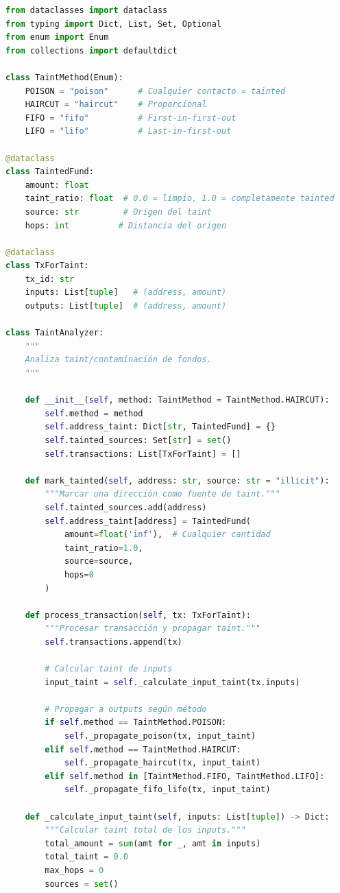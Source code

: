 \documentclass[11pt,a4paper,twoside]{book}
\theoremstyle{definition}
\theoremstyle{remark}
\begin{document}
\begin{lstlisting}[language=Python, caption={Sistema de Taint Analysis}]
from dataclasses import dataclass
from typing import Dict, List, Set, Optional
from enum import Enum
from collections import defaultdict

class TaintMethod(Enum):
    POISON = "poison"      # Cualquier contacto = tainted
    HAIRCUT = "haircut"    # Proporcional
    FIFO = "fifo"          # First-in-first-out
    LIFO = "lifo"          # Last-in-first-out

@dataclass
class TaintedFund:
    amount: float
    taint_ratio: float  # 0.0 = limpio, 1.0 = completamente tainted
    source: str         # Origen del taint
    hops: int          # Distancia del origen

@dataclass
class TxForTaint:
    tx_id: str
    inputs: List[tuple]   # (address, amount)
    outputs: List[tuple]  # (address, amount)

class TaintAnalyzer:
    """
    Analiza taint/contaminación de fondos.
    """
    
    def __init__(self, method: TaintMethod = TaintMethod.HAIRCUT):
        self.method = method
        self.address_taint: Dict[str, TaintedFund] = {}
        self.tainted_sources: Set[str] = set()
        self.transactions: List[TxForTaint] = []
    
    def mark_tainted(self, address: str, source: str = "illicit"):
        """Marcar una dirección como fuente de taint."""
        self.tainted_sources.add(address)
        self.address_taint[address] = TaintedFund(
            amount=float('inf'),  # Cualquier cantidad
            taint_ratio=1.0,
            source=source,
            hops=0
        )
    
    def process_transaction(self, tx: TxForTaint):
        """Procesar transacción y propagar taint."""
        self.transactions.append(tx)
        
        # Calcular taint de inputs
        input_taint = self._calculate_input_taint(tx.inputs)
        
        # Propagar a outputs según método
        if self.method == TaintMethod.POISON:
            self._propagate_poison(tx, input_taint)
        elif self.method == TaintMethod.HAIRCUT:
            self._propagate_haircut(tx, input_taint)
        elif self.method in [TaintMethod.FIFO, TaintMethod.LIFO]:
            self._propagate_fifo_lifo(tx, input_taint)
    
    def _calculate_input_taint(self, inputs: List[tuple]) -> Dict:
        """Calcular taint total de los inputs."""
        total_amount = sum(amt for _, amt in inputs)
        total_taint = 0.0
        max_hops = 0
        sources = set()
        

\end{lstlisting}
\end{document}
